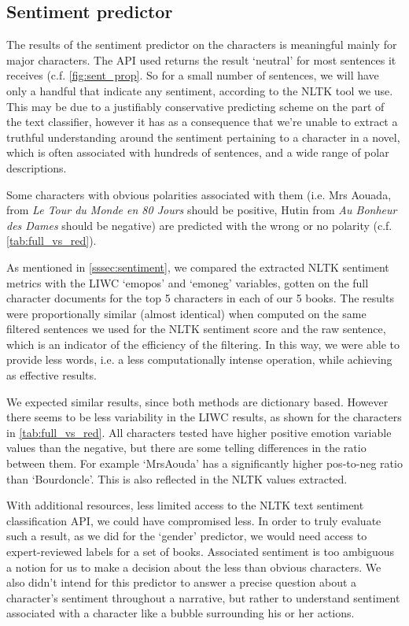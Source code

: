 \subsection{Sentiment predictor}
The results of the sentiment predictor on the characters is meaningful mainly for major characters. The API used returns the result `neutral' for most sentences it receives (c.f. \cref{fig:sent_prop}. So for a small number of sentences, we will have only a handful that indicate any sentiment, according to the NLTK tool we use. This may be due to a justifiably conservative predicting scheme on the part of the text classifier, however it has as a consequence that we're unable to extract a truthful understanding around the sentiment pertaining to a character in a novel, which is often associated with hundreds of sentences, and a wide range of polar descriptions.

Some characters with obvious polarities associated with them (i.e. Mrs Aouada, from \textit{Le Tour du Monde en 80 Jours} should be positive, Hutin from \textit{Au Bonheur des Dames} should be negative) are predicted with the wrong or no polarity (c.f. \cref{tab:full_vs_red}).

As mentioned in \cref{sssec:sentiment}, we compared the extracted NLTK sentiment metrics with the LIWC \cite{liwc2015} `emopos' and `emoneg' variables, gotten on the full character documents for the top 5 characters in each of our 5 books. The results were proportionally similar (almost identical) when computed on the same filtered sentences we used for the NLTK sentiment score and the raw sentence, which is an indicator of the efficiency of the filtering. In this way, we were able to provide less words, i.e. a less computationally intense operation, while achieving as effective results.

We expected similar results, since both methods are dictionary based. However there seems to be less variability in the LIWC results, as shown for the characters in \cref{tab:full_vs_red}. All characters tested have higher positive emotion variable values than the negative, but there are some telling differences in the ratio between them. For example `MrsAouda' has a significantly higher pos-to-neg ratio than `Bourdoncle'. This is also reflected in the NLTK values extracted.

With additional resources, less limited access to the NLTK text sentiment classification API, we could have compromised less. In order to truly evaluate such a result, as we did for the `gender' predictor, we would need access to expert-reviewed labels for a set of books. Associated sentiment is too ambiguous a notion for us to make a decision about the less than obvious characters. We also didn't intend for this predictor to answer a precise question about a character's sentiment throughout a narrative, but rather to understand sentiment associated with a character like a bubble surrounding his or her actions. 


